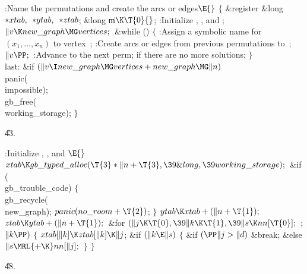 \Y\B\4:Name the permutations and create the arcs or edges\X${}\E{}$\6
${}\{{}$\5
\1\&{register} \&{long} ${}{*}\\{xtab},{}$ ${}{*}\\{ytab},{}$ ${}{*}%
\\{ztab}{}$;\6
\&{long} \|m${}\K\T{0}{}$;\7
:Initialize , , and \X;\6
${}\|v\K\\{new\_graph}\MG\\{vertices};{}$\6
\&{while} ()\5
${}\{{}$\1\6
:Assign a symbolic name for $(x_1,\ldots,x_n)$ to vertex~\X;\6
:Create arcs or edges from previous permutations to~\X;\6
${}\|v\PP;{}$\6
:Advance to the next perm;  if there are no more
solutions\X;\6
\4${}\}{}$\2\6
\4\\{last}:\5
\&{if} ${}(\|v\I\\{new\_graph}\MG\\{vertices}+\\{new\_graph}\MG\|n){}$\1\5
\\{panic}(\\{impossible});\2\6
\\{gb\_free}(\\{working\_storage});\6
\4${}\}{}$\2\par
\U43.\fi

\B{}:Initialize , , and \X${}%
\E{}$\6
$\\{xtab}\K\\{gb\_typed\_alloc}(\T{3}*\|n+\T{3},\39\&{long},\39\\{working%
\_storage});{}$\6
\&{if} (\\{gb\_trouble\_code})\5
${}\{{}$\1\6
\\{gb\_recycle}(\\{new\_graph});\5
${}\\{panic}(\\{no\_room}+\T{2}){}$;\5
${}\}{}$\2\6
${}\\{ytab}\K\\{xtab}+(\|n+\T{1});{}$\6
${}\\{ztab}\K\\{ytab}+(\|n+\T{1});{}$\6
\&{for} ${}(\|j\K\T{0},\39\|k\K\T{1},\39\|s\K\\{nn}[\T{0}];{}$  ; ${}\|k\PP){}$%
\5
${}\{{}$\1\6
${}\\{xtab}[\|k]\K\\{ztab}[\|k]\K\|j{}$;\6
\&{if} ${}(\|k\E\|s){}$\5
${}\{{}$\1\6
\&{if} ${}(\PP\|j>\|d){}$\1\5
\&{break};\2\6
\&{else}\1\5
${}\|s\MRL{+{\K}}\\{nn}[\|j];{}$\2\6
\4${}\}{}$\2\6
\4${}\}{}$\2\par
\U48.\fi

